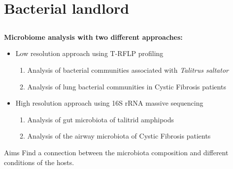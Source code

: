 \documentclass[10pt]{beamer}
\begin{document}
\section{Bacterial landlord}
\subsection{}

\begin{frame}
	\textbf{\Large{Microbiome analysis with two different approaches:}}
	\vspace{4mm}
	\begin{itemize}
		\item Low resolution approach using T-RFLP profiling
		\begin{enumerate}
			\item Analysis of bacterial communities associated with \textit{Talitrus saltator}
			\item Analysis of lung bacterial communities in Cystic Fibrosis patients
		\end{enumerate}
		\item High resolution approach using 16S rRNA massive sequencing
		\begin{enumerate}
			\item Analysis of gut microbiota of talitrid amphipods
			\item Analysis of the airway microbiota of Cystic Fibrosis patients
		\end{enumerate}
	\end{itemize}
	\vspace{4mm}
	\begin{block}{Aims}
		Find a connection between the microbiota composition and different conditions of the hosts.
	\end{block}
\end{frame}
\end{document}
